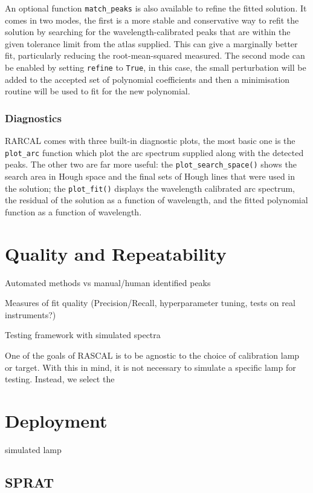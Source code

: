 \documentclass{aa}
\begin{document}
An optional function \texttt{match\_peaks} is also available to refine the
fitted solution. It comes in two modes, the first is a more stable and
conservative way to refit the solution by searching for the wavelength-calibrated
peaks that are within the given tolerance limit from the atlas supplied. This
can give a marginally better fit, particularly reducing the root-mean-squared
measured. The second mode can be enabled by setting \texttt{refine} to
\texttt{True}, in this case, the small perturbation will be added to the accepted
set of polynomial coefficients and then a minimisation routine will be used to
fit for the new polynomial.

\subsubsection*{Diagnostics}
\textsc{RARCAL} comes with three built-in diagnostic plots, the most basic
one is the \texttt{plot\_arc} function which plot the arc spectrum
supplied along with the detected peaks. The other two are far more useful:
the \texttt{plot\_search\_space()} shows the search area in Hough space and
the final sets of Hough lines that were used in the solution; the
\texttt{plot\_fit()} displays the wavelength calibrated arc spectrum, the
residual of the solution as a function of wavelength, and the fitted polynomial
function as a function of wavelength.

\section{Quality and Repeatability}

Automated methods vs manual/human identified peaks

Measures of fit quality (Precision/Recall, hyperparameter tuning, tests on real instruments?)

Testing framework with simulated spectra

One of the goals of RASCAL is to be agnostic to the choice of calibration lamp or target. With 
this in mind, it is not necessary to simulate a specific lamp for testing. Instead, we select
the 

\section{Deployment}
simulated lamp
\subsection{SPRAT}
\end{document}
